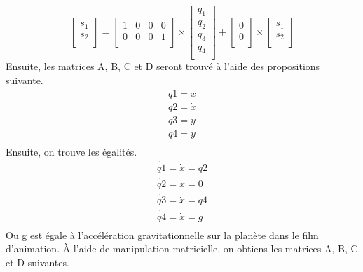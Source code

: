 \documentclass{article}
\begin{document}
\begin{equation}
  	\begin{bmatrix}
 	s_{1} \\ 
  	s_{2} \\
  	\end{bmatrix}
  	=
  	\begin{bmatrix}
  	1 & 0 & 0 & 0 \\ 
  	0 & 0 & 0 & 1 \\
  	\end{bmatrix}
 	\times
  	\begin{bmatrix}
  	q_{1} \\ 
  	q_{2} \\ 
  	q_{3} \\ 
 	q_{4} \\
  	\end{bmatrix}
  	+
  	\begin{bmatrix}
  	0 \\ 
  	0 \\
  	\end{bmatrix}
  	\times
  	\begin{bmatrix}
  	s_{1} \\ 
  	s_{2} \\
  	\end{bmatrix}
\end{equation}
Ensuite, les matrices A, B, C et D seront trouvé à l'aide des propositions suivante.
\begin{equation}
\begin{matrix}
q1 = x \\ 
q2 = \dot{x} \\
q3 = y \\
q4 = \dot{y} \\
\end{matrix}
\end{equation}
Ensuite, on trouve les égalités.
\begin{equation}
\begin{matrix}
\dot{q1} = \dot{x} = q2 \\ 
\dot{q2} = \ddot{x} = 0 \\
\dot{q3} = \dot{x} = q4 \\ 
\dot{q4} = \dot{x} = g \\
\end{matrix}
\end{equation}
\newpage
\noindent
Ou g est égale à l'accélération gravitationnelle sur la planète dans le film d'animation. À l'aide de manipulation matricielle, on obtiens les matrices A, B, C et D suivantes.
\end{document}
